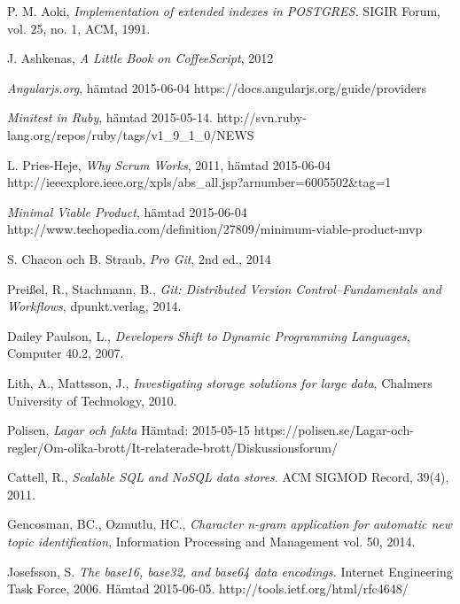 \documentclass[a4paper,12pt,oneside,final]{extbook}
\begin{document}
\begin{thebibliography}{99}
  P. M. Aoki, \emph{Implementation of extended indexes in POSTGRES.} SIGIR Forum, vol. 25, no. 1, ACM, 1991.

  J. Ashkenas, \emph{A Little Book on CoffeeScript}, 2012

    \emph{Angularjs.org}, hämtad 2015-06-04
    \newline https://docs.angularjs.org/guide/providers

  \emph{Minitest in Ruby}, hämtad 2015-05-14.
  \newline http://svn.ruby-lang.org/repos/ruby/tags/v1\_9\_1\_0/NEWS

  L. Pries-Heje, \emph{Why Scrum Works}, 2011, hämtad 2015-06-04
  \newline http://ieeexplore.ieee.org/xpls/abs\_all.jsp?arnumber=6005502\&tag=1

  \emph{Minimal Viable Product}, hämtad 2015-06-04
  \newline http://www.techopedia.com/definition/27809/minimum-viable-product-mvp

  S. Chacon och B. Straub, \emph{Pro Git}, 2nd ed., 2014

  Preißel, R., Stachmann, B., \emph{Git: Distributed Version Control--Fundamentals and Workflows}, dpunkt.verlag, 2014.

  Dailey Paulson, L., \emph{Developers Shift to Dynamic Programming Languages}, Computer 40.2, 2007.

  Lith, A., Mattsson, J., \emph{Investigating storage solutions for large data}, Chalmers University of Technology, 2010.

  Polisen, \emph{Lagar och fakta} Hämtad: 2015-05-15
  \newline https://polisen.se/Lagar-och-regler/Om-olika-brott/It-relaterade-brott/Diskussionsforum/

  Cattell, R., \emph{Scalable SQL and NoSQL data stores}. ACM SIGMOD Record, 39(4), 2011.

  Gencosman, BC., Ozmutlu, HC., \emph{Character n-gram application for automatic new topic identification},
  Information Processing and Management vol. 50, 2014.

  Josefsson, S. \emph{The base16, base32, and base64 data encodings.}
  Internet Engineering Task Force, 2006. Hämtad 2015-06-05. http://tools.ietf.org/html/rfc4648/


\end{thebibliography}
\end{document}

